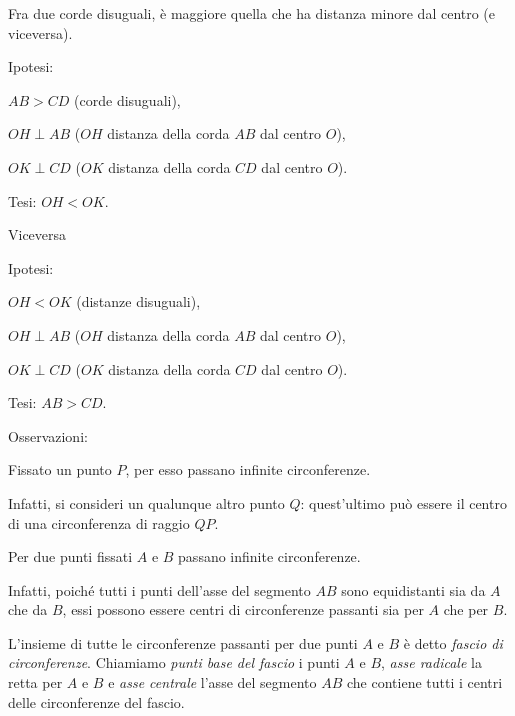\begin{teorema}
Fra due corde disuguali, è maggiore quella che ha distanza minore dal 
centro (e viceversa).
\end{teorema}

\noindent Ipotesi:
\begin{itemize*}
\item $AB>CD$ (corde disuguali),
\item $OH\perp AB$ ($OH$ distanza della corda $AB$ dal centro $O$),
\item $OK\perp CD$ ($OK$ distanza della corda $CD$ dal centro $O$).
\end{itemize*}
\noindent Tesi: $OH < OK$.\vspace{10pt}

\begin{minipage}{0.35\textwidth}
  \centering
\end{minipage}\vspace{10pt}

\noindent Viceversa\vspace{10pt}

\noindent Ipotesi:
\begin{itemize*}
\item $OH<OK$ (distanze disuguali),
\item $OH\perp AB$ ($OH$ distanza della corda $AB$ dal centro $O$),
\item $OK\perp CD$ ($OK$ distanza della corda $CD$ dal centro $O$).
\end{itemize*}
\noindent Tesi: $AB>CD$.


Osservazioni:
\begin{itemize*}
\item Fissato un punto $P$, per esso passano infinite circonferenze.

Infatti, si consideri un qualunque altro punto $Q$: quest'ultimo può 
essere il centro di una circonferenza di raggio $QP$.

\item Per due punti fissati $A$ e $B$ passano infinite circonferenze.

Infatti, poiché tutti i punti dell'asse del segmento $AB$ sono 
equidistanti sia da $A$ che da $B$, essi possono essere centri di 
circonferenze passanti sia per $A$ che per $B$.
\end{itemize*}

\begin{definizione}
L'insieme di tutte le circonferenze passanti per due punti $A$ e $B$ 
è detto \emph{fascio di circonferenze}. Chiamiamo \emph{punti base del fascio} i punti $A$ e $B$, \emph{asse 
radicale} la retta per $A$ e $B$ e \emph{asse centrale} l'asse del segmento $AB$ che contiene 
tutti i centri delle circonferenze del fascio.
\end{definizione}

